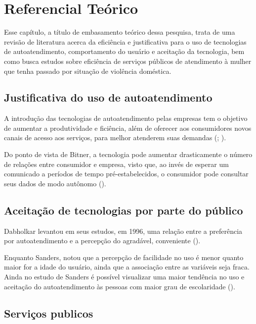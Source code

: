 \section{Referencial Teórico}
\vspace*{1cm}
Esse capítulo, a título de embasamento teórico dessa pesquisa, trata de uma revisão de literatura acerca da eficiência e justificativa para o uso de tecnologias de autoatendimento, comportamento do usuário e aceitação da tecnologia, bem como busca estudos sobre eficiência de serviços públicos de atendimento à mulher que tenha passado por situação de violência doméstica.
\subsection{Justificativa do uso de autoatendimento}
A introdução das tecnologias de autoatendimento pelas empresas tem o objetivo de aumentar a produtividade e ficiência, além de oferecer aos consumidores novos canais de acesso aos serviços, para melhor atenderem suas demandas (\cite{autoatendimento-em-aeroportos}; \cite{walker-service-delivery}).

Do ponto de vista de Bitner, a tecnologia pode aumentar drasticamente o número de relações entre consumidor e empresa, visto que, ao invés de esperar um comunicado a períodos de tempo pré-estabelecidos, o consumidor pode consultar seus dados de modo autônomo (\cite{bitner-service-encounters}).
\subsection{Aceitação de tecnologias por parte do público}
Dabholkar levantou em seus estudos, em 1996, uma relação entre a preferência por autoatendimento e a percepção do agradável, conveniente (\cite{dabholkar-service-encounters}).

Enquanto Sanders, notou que a percepção de facilidade no uso é menor quanto maior for a idade do usuário, ainda que a associação entre as variáveis seja fraca. Ainda no estudo de Sanders é possível visualizar uma maior tendência no uso e aceitação do autoatendimento às pessoas com maior grau de escolaridade (\cite{autoatendimento-em-aeroportos}).
\subsection{Serviços publicos}

\newpage

